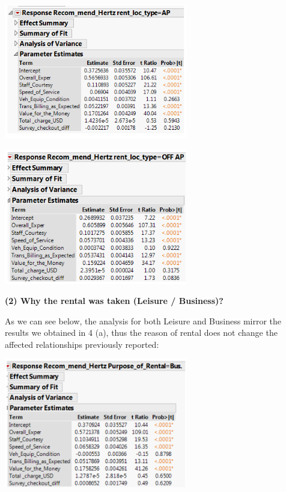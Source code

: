 \documentclass[10pt, oneside,spanish]{article}
\begin{document}
\begin{center}
\includegraphics[width=8cm]{4bi.PNG}
\end{center}

\begin{center}
\includegraphics[width=8cm]{4bi2.PNG}
\end{center}

\textbf{(2) Why the rental was taken (Leisure / Business)?}

As we can see below, the analysis for both Leisure and Business mirror the results we obtained in 4 (a), thus the reason of rental does not change the affected relationships previously reported:

\begin{center}
\includegraphics[width=8cm]{4bii.PNG}
\end{center}
\end{document}
